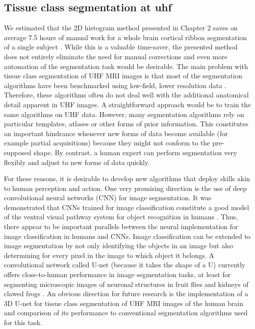 \subsection{Tissue class segmentation at uhf}
We estimated that the 2D histogram method presented in Chapter 2 saves on average 7.5 hours of manual work for a whole brain cortical ribbon segmentation of a single subject \parencite{Gulban2018a}. While this is a valuable time-saver, the presented method does not entirely eliminate the need for manual corrections and even more automation of the segmentation task would be desirable. The main problem with tissue class segmentation of UHF MRI images is that most of the segmentation algorithms have been benchmarked using low-field, lower resolution data \parencite{Helms2016}. Therefore, these algorithms often do not deal well with the additional anatomical detail apparent in UHF images. A straightforward approach would be to train the same algorithms on UHF data. However, many segmentation algorithms \parencite{Ashburner2005, Bazin2014} rely on particular templates, atlases or other forms of prior information. This constitutes an important hindrance whenever new forms of data become available (for example partial acquisitions) because they might not conform to the pre-supposed shape. By contrast, a human expert can perform segmentation very flexibly and adjust to new forms of data quickly.

For these reasons, it is desirable to develop new algorithms that deploy skills akin to human perception and action. One very promising direction is the use of deep convolutional neural networks (CNN) for image segmentation. It was demonstrated that CNNs trained for image classification constitute a good model of the ventral visual pathway system for object recognition in humans \parencite{Kriegeskorte2014, Yamins2016}. Thus, there appear to be important parallels between the neural implementation for image classification in humans and CNNs. Image classification can be extended to image segmentation by not only identifying the objects in an image but also determining for every pixel in the image to which object it belongs. A convolutional network called U-net (because it takes the shape of a U) currently offers close-to-human performance in image segmentation tasks, at least for segmenting microscopic images of neuronal structures in fruit flies \parencite{Ronneberger2015} and kidneys of clawed frogs \parencite{Cicek2016}. An obvious direction for future research is the implementation of a 3D U-net for tissue class segmentation of UHF MRI images of the human brain and comparison of its performance to conventional segmentation algorithms used for this task.

